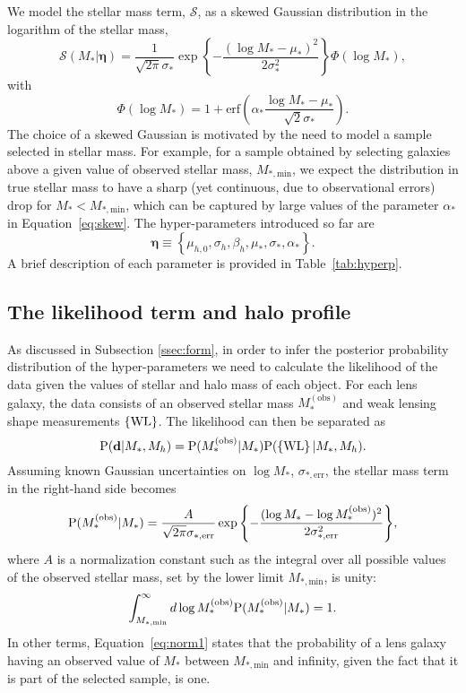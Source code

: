 \documentclass[usenatbib]{mnras}
\def\mobs{M_*^{\mathrm{(obs)}}}
\def\mstar{M_*}
\def\mstarmin{M_{*,{\mathrm{min}}}}
\def\mhalo{M_{h}}
\def\mstarerr{\sigma_{*, {\mathrm{err}}}}
\def\hyperp{\boldsymbol{\eta}}
\def\data{\mathbf{d}}
\def\wl{\left\{\rm{WL}\right\}}
\def\Tref#1{Table~\ref{#1}\xspace}
\def\Eref#1{Equation~\ref{#1}\xspace}
\def\pr{{\rm P}}
\begin{document}
We model the stellar mass term, $\mathcal{S}$, as a skewed Gaussian distribution in the logarithm of the stellar mass,
\begin{equation}\label{eq:fullskew}
\mathcal{S}(\mstar|\hyperp) = \frac{1}{\sqrt{2\pi}\sigma_*}\exp{\left\{-\frac{(\log{\mstar} - \mu_*)^2}{2\sigma_*^2}\right\}}\Phi(\log{M_*}),
\end{equation}
with
\begin{equation}\label{eq:skew}
\Phi(\log{\mstar}) = 1 + \mathrm{erf}\left(\alpha_*\frac{\log{\mstar} - \mu_*}{\sqrt{2}\sigma_*}\right).
\end{equation}
The choice of a skewed Gaussian is motivated by the need to model a sample selected in stellar mass.
For example, for a sample obtained by selecting galaxies above a given value of observed stellar mass, $\mstarmin$, we expect the distribution in true stellar mass to have a sharp (yet continuous, due to observational errors) drop for $\mstar < \mstarmin$, which can be captured by large values of the parameter $\alpha_*$ in \Eref{eq:skew}.
The hyper-parameters introduced so far are
\begin{equation}
\hyperp \equiv \left\{\mu_{h,0},\sigma_h,\beta_h,\mu_*,\sigma_*,\alpha_* \right\}.
\end{equation}
A brief description of each parameter is provided in \Tref{tab:hyperp}.

\subsection{The likelihood term and halo profile}\label{ssec:like}

As discussed in Subsection \ref{ssec:form}, in order to infer the posterior probability distribution of the hyper-parameters we need to calculate the likelihood of the data given the values of stellar and halo mass of each object.
For each lens galaxy, the data consists of an observed stellar mass $\mobs$ and weak lensing shape measurements $\wl$.
The likelihood can then be separated as
\begin{equation}\label{eq:liketerms}
\pr(\data | \mstar, \mhalo) = \pr(\mobs | \mstar) \pr(\wl | \mstar, \mhalo).
\end{equation}
Assuming known Gaussian uncertainties on $\log{\mstar}$, $\mstarerr$, the stellar mass term in the right-hand side becomes
\begin{equation}
\pr(\mobs | \mstar) = \frac{A}{\sqrt{2\pi}\mstarerr}\exp{\left\{ - \frac{(\log{\mstar} - \log{\mobs})^2}{2\mstarerr^2}\right\}},
\end{equation}
where $A$ is a normalization constant such as the integral over all possible values of the observed stellar mass, set by the lower limit $\mstarmin$, is unity:
\begin{equation}\label{eq:norm1}
\int_{\mstarmin}^{\infty} d \log{\mobs} \pr(\mobs | \mstar) = 1.
\end{equation}
In other terms, \Eref{eq:norm1} states that the probability of a lens galaxy having an observed value of $M_*$ between $\mstarmin$ and infinity, given the fact that it is part of the selected sample, is one.
\end{document}
